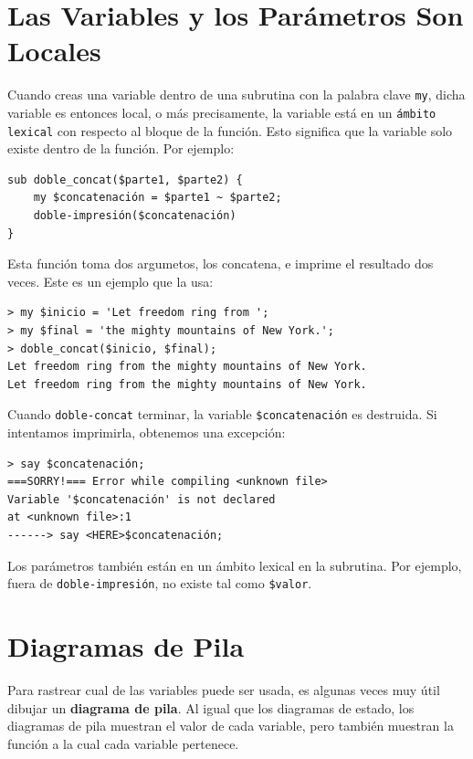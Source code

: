 \section{Las Variables y los Parámetros Son Locales}
\label{localvar}

Cuando creas una variable dentro de una subrutina con 
la palabra clave {\tt my}, dicha variable es entonces 
local, o más precisamente, la variable está en un {\tt ámbito
lexical} con respecto al bloque de la función. Esto significa
que la variable solo existe dentro de la función. Por ejemplo:

\begin{verbatim}
sub doble_concat($parte1, $parte2) {
    my $concatenación = $parte1 ~ $parte2;
    doble-impresión($concatenación)
}
\end{verbatim}
%
Esta función toma dos argumetos, los concatena, e imprime
el resultado dos veces. Este es un ejemplo que la usa:

\begin{verbatim}
> my $inicio = 'Let freedom ring from ';
> my $final = 'the mighty mountains of New York.';
> doble_concat($inicio, $final);
Let freedom ring from the mighty mountains of New York.
Let freedom ring from the mighty mountains of New York.
\end{verbatim}
%
Cuando \verb|doble-concat| terminar, la variable \verb|$concatenación|
es destruida. Si intentamos imprimirla, obtenemos una excepción:

\begin{verbatim}
> say $concatenación;
===SORRY!=== Error while compiling <unknown file>
Variable '$concatenación' is not declared
at <unknown file>:1
------> say <HERE>$concatenación;
\end{verbatim}
%
Los parámetros también están en un ámbito lexical
en la subrutina. Por ejemplo, fuera de \verb|doble-impresión|, 
no existe tal como \verb|$valor|.


\section{Diagramas de Pila}
\label{stackdiagram}

Para rastrear cual de las variables puede ser usada, es algunas veces
muy útil dibujar un {\bf diagrama de pila}. Al igual que los diagramas de
estado, los diagramas de pila muestran el valor de cada variable, pero
también muestran la función a la cual cada variable pertenece.

